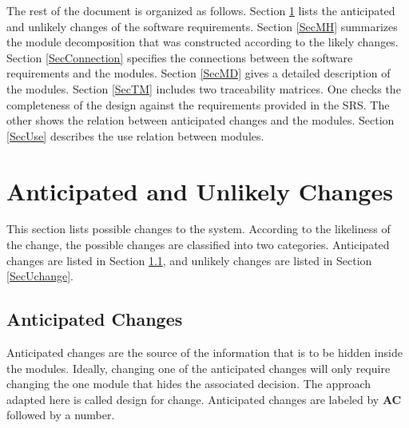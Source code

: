 \documentclass[12pt, titlepage]{article}
\begin{document}
The rest of the document is organized as follows. Section
\ref{SecChange} lists the anticipated and unlikely changes of the software
requirements. Section \ref{SecMH} summarizes the module decomposition that
was constructed according to the likely changes. Section \ref{SecConnection}
specifies the connections between the software requirements and the
modules. Section \ref{SecMD} gives a detailed description of the
modules. Section \ref{SecTM} includes two traceability matrices. One checks
the completeness of the design against the requirements provided in the SRS. The
other shows the relation between anticipated changes and the modules. Section
\ref{SecUse} describes the use relation between modules.

\section{Anticipated and Unlikely Changes} \label{SecChange}

This section lists possible changes to the system. According to the likeliness
of the change, the possible changes are classified into two
categories. Anticipated changes are listed in Section \ref{SecAchange}, and
unlikely changes are listed in Section \ref{SecUchange}.

\subsection{Anticipated Changes} \label{SecAchange}

Anticipated changes are the source of the information that is to be hidden
inside the modules. Ideally, changing one of the anticipated changes will only
require changing the one module that hides the associated decision. The approach
adapted here is called design for change. Anticipated changes are labeled by
{\bf AC} followed by a number.
\end{document}
